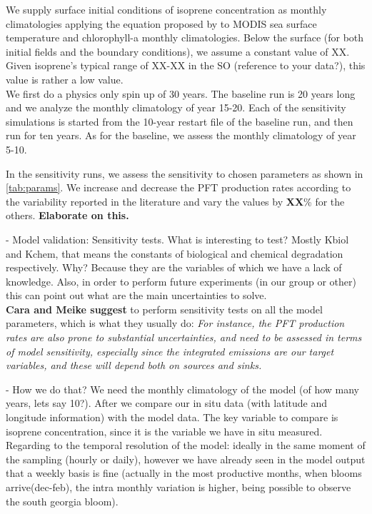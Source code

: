 \documentclass[draft,linenumbers]{agujournal}
\begin{document}
We supply surface initial conditions of isoprene concentration as monthly climatologies applying the equation proposed by \citep{hackenberg2017potential} to MODIS sea surface temperature and chlorophyll-a monthly climatologies. Below the surface (for both initial fields and the boundary conditions), we assume a constant value of XX. Given isoprene's typical range of XX-XX in the SO (reference to your data?), this value is rather a low value. \\

We first do a physics only spin up of 30 years. The baseline run is 20 years long and we analyze the monthly climatology of year 15-20. Each of the sensitivity simulations is started from the 10-year restart file of the baseline run, and then run for ten years. As for the baseline, we assess the monthly climatology of year 5-10.

In the sensitivity runs, we assess the sensitivity to chosen parameters as shown in \ref{tab:params}. We increase and decrease the PFT production rates according to the variability reported in the literature and vary the values by \textbf{XX}\% for the others. \textbf{Elaborate on this.} 

- Model validation: Sensitivity tests. What is interesting to test? Mostly Kbiol and Kchem, that means the constants of biological and chemical degradation respectively. Why? Because they are the variables of which we have a lack of knowledge. Also, in order to perform future experiments (in our group or other) this can point out what are the main uncertainties to solve.\\

\textbf{Cara and Meike suggest} to perform sensitivity tests on all the model parameters, which is what they usually do:\textit{ For instance, the PFT production rates are also prone to substantial uncertainties, and need to be assessed in terms of model sensitivity, especially since the integrated emissions are our target variables, and these will depend both on sources and sinks.}

- How we do that? We need the monthly climatology of the model (of how many years, lets say 10?). After we compare our in situ data (with latitude and longitude information) with the model data. The key variable to compare is isoprene concentration, since it is the variable we have in situ measured. Regarding to the temporal resolution of the model: ideally in the same moment of the sampling (hourly or daily), however we have already seen in the model output that a weekly basis is fine (actually in the most productive months, when blooms arrive(dec-feb), the intra monthly variation is higher, being possible to observe the south georgia bloom).\\
\end{document}
